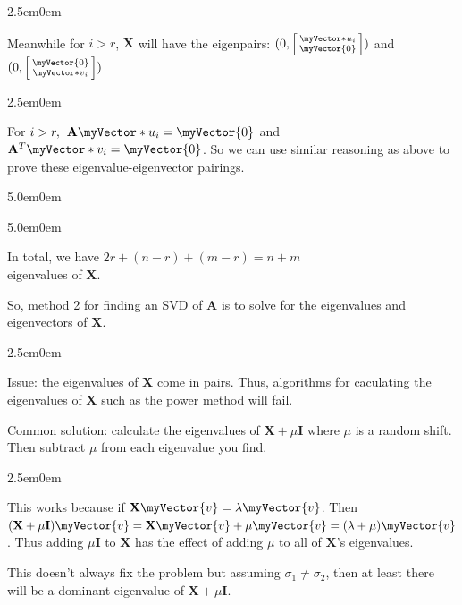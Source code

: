\documentclass{book}
\newcommand{\hTwo}{%
   \color{MidnightBlue}%
   \fontsize{13}{15}\selectfont%
}
\newcommand{\hThree}{%
   \color{PineGreen}
   \fontsize{13}{15}\selectfont%
}
\newcommand{\hFour}{%
   \color{Cerulean}
   \fontsize{12}{14}\selectfont%
}
\newcommand{\myComment}{%
   \color{RawerSienna}%
   \fontsize{12}{14}\selectfont%
}
\newenvironment{myIndent}{%
   \begin{adjustwidth}{2.5em}{0em}%
}{%
   \end{adjustwidth}%
}
\newenvironment{myDindent}{%
   \begin{adjustwidth}{5.0em}{0em}%
}{%
   \end{adjustwidth}%
}
\newcommand{\retTwo}{\hfill\bigbreak}
\newcommand{\mVec}[1]{\myVector{#1}}
\newcommand{\mVecAst}[1]{\myVector*{#1}}
\newcommand{\mMat}[1]{\mathbf{#1}}
\begin{document}
{\begin{myIndent}
      Meanwhile for $i > r$, $\mMat{X}$ will have the eigenpairs: $(0, 
      \left[\begin{smallmatrix}
         \mVecAst{u}_i \\ \mVec{0}
      \end{smallmatrix}\right])$ and $(0, 
      \left[\begin{smallmatrix}
         \mVec{0} \\ \mVecAst{v}_i
      \end{smallmatrix}\right])$
      
      {\begin{myIndent} \hThree
         For $i > r, \hspace{0.4em}\mMat{A}\mVecAst{u}_i = \mVec{0}$ and $\mMat{A}^T\mVecAst{v}_i = \mVec{0}$. So we can use similar reasoning as above to prove these eigenvalue-eigenvector pairings.\retTwo

         
         {\begin{myDindent}\begin{myDindent} \myComment
            In total, we have $2r + (n - r) + (m - r) = n + m$\\ eigenvalues of $\mMat{X}$.
         \end{myDindent}\end{myDindent}}
      \end{myIndent}}
   \end{myIndent}}

   So, method 2 for finding an SVD of $\mMat{A}$ is to solve for the eigenvalues and eigenvectors of $\mMat{X}$.\\
   
   {\begin{myIndent} \hTwo
      {\color{BrickRed}Issue: the eigenvalues of $\mMat{X}$ come in pairs. Thus, algorithms for caculating the eigenvalues of $\mMat{X}$ such as the power method will fail.}\retTwo

      Common solution: calculate the eigenvalues of $\mMat{X} + \mu \mMat{I}$ where $\mu$ is a random shift. Then subtract $\mu$ from each eigenvalue you find.
      {\begin{myIndent} \hFour
         This works because if $\mMat{X}\mVec{v} = \lambda \mVec{v}$. Then $(\mMat{X} + \mu \mMat{I})\mVec{v} = \mMat{X}\mVec{v} + \mu\mVec{v} = (\lambda + \mu)\mVec{v}$. Thus adding $\mu\mMat{I}$ to $\mMat{X}$ has the effect of adding $\mu$ to all of $\mMat{X}$'s eigenvalues. \retTwo
      \end{myIndent}}

      This doesn't always fix the problem but assuming $\sigma_1 \neq \sigma_2$, then at least there will be a dominant eigenvalue of $\mMat{X} + \mu \mMat{I}$. \retTwo
   \end{myIndent}}
\end{document}
